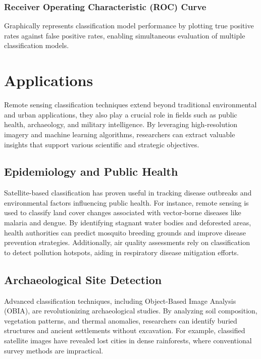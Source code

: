 \documentclass[
  letterpaper,
]{scrbook}
\begin{document}
\subsubsection{Receiver Operating Characteristic (ROC)
Curve}\label{receiver-operating-characteristic-roc-curve}

Graphically represents classification model performance by plotting true
positive rates against false positive rates, enabling simultaneous
evaluation of multiple classification models.

\section{Applications}\label{applications-5}

Remote sensing classification techniques extend beyond traditional
environmental and urban applications, they also play a crucial role in
fields such as public health, archaeology, and military intelligence. By
leveraging high-resolution imagery and machine learning algorithms,
researchers can extract valuable insights that support various
scientific and strategic objectives.

\subsection{\texorpdfstring{\textbf{Epidemiology and Public
Health}}{Epidemiology and Public Health}}\label{epidemiology-and-public-health}

Satellite-based classification has proven useful in tracking disease
outbreaks and environmental factors influencing public health. For
instance, remote sensing is used to classify land cover changes
associated with vector-borne diseases like malaria and dengue. By
identifying stagnant water bodies and deforested areas, health
authorities can predict mosquito breeding grounds and improve disease
prevention strategies. Additionally, air quality assessments rely on
classification to detect pollution hotspots, aiding in respiratory
disease mitigation efforts.

\subsection{\texorpdfstring{\textbf{Archaeological Site
Detection}}{Archaeological Site Detection}}\label{archaeological-site-detection}

Advanced classification techniques, including Object-Based Image
Analysis (OBIA), are revolutionizing archaeological studies. By
analyzing soil composition, vegetation patterns, and thermal anomalies,
researchers can identify buried structures and ancient settlements
without excavation. For example, classified satellite images have
revealed lost cities in dense rainforests, where conventional survey
methods are impractical.
\end{document}
